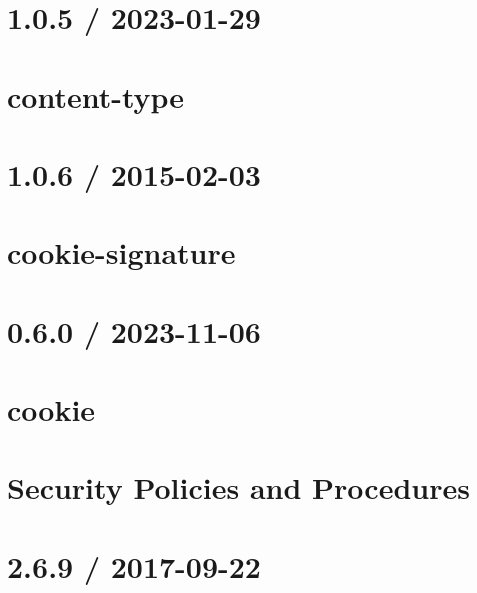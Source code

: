 \documentclass[twoside]{book}
\newcommand{\+}{\discretionary{\mbox{\scriptsize$\hookleftarrow$}}{}{}}
\begin{document}
\chapter{1.0.5 / 2023-\/01-\/29}
\label{md_src_nodejs_node_modules_content_type_HISTORY}

\chapter{content-\/type}
\label{md_src_nodejs_node_modules_content_type_README}

\chapter{1.0.6 / 2015-\/02-\/03}
\label{md_src_nodejs_node_modules_cookie_signature_History}

\chapter{cookie-\/signature}
\label{md_src_nodejs_node_modules_cookie_signature_Readme}

\chapter{0.6.0 / 2023-\/11-\/06}
\label{md_src_nodejs_node_modules_cookie_HISTORY}

\chapter{cookie}
\label{md_src_nodejs_node_modules_cookie_README}

\chapter{Security Policies and Procedures}
\label{md_src_nodejs_node_modules_cookie_SECURITY}

\chapter{2.6.9 / 2017-\/09-\/22}
\label{md_src_nodejs_node_modules_debug_CHANGELOG}

\end{document}
